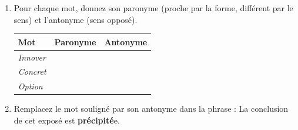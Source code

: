 \documentclass[11pt]{article}
\begin{document}
\begin{exercice}
\begin{enumerate}
    \item Pour chaque mot, donnez son paronyme (proche par la forme, différent par le sens) et l'antonyme (sens opposé).
    \begin{tabular}{|l|l|l|}
    \hline
    \textbf{Mot} & \textbf{Paronyme} & \textbf{Antonyme} \\
    \hline
    \textit{Innover} & & \\
    \hline
    \textit{Concret} & & \\
    \hline
    \textit{Option} & & \\
    \hline
    \end{tabular}
    \item Remplacez le mot souligné par son antonyme dans la phrase : \og La conclusion de cet exposé est \textbf{précipité}e. \fg
\end{enumerate}
\end{exercice}
\end{document}
